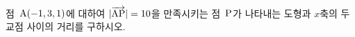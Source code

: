 점~$\mathrm{A}(-1{,}\mkern3mu\mathopen{}3{,}\mkern3mu\mathopen{}1)$에 대하여 $|\overrightarrow{\mathrm{AP}}|=10$을 만족시키는 점~$\mathrm{P}$가 나타내는 도형과 $x$축의 두 교점 사이의 거리를 구하시오.
